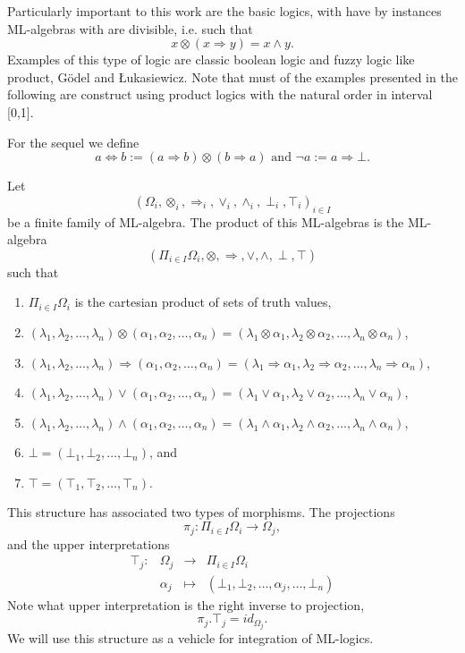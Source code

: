 \documentclass[oribibl]{llncs}
\begin{document}
Particularly important to this work are the basic logics, with have by instances ML-algebras with are divisible, i.e. such that
\[
x\otimes(x\Rightarrow y)= x \wedge y.
\]
Examples of this type of logic are classic boolean logic and fuzzy logic like product, G\"{o}del and {\L}ukasiewicz. Note that must of the examples presented in the following are construct using product logics with the natural order in interval [0,1].

For the sequel we define
\[
a\Leftrightarrow b := (a\Rightarrow b)\otimes (b\Rightarrow a) \text{ and }
\neg a := a\Rightarrow \bot.
\]

Let
\[
(\Omega_i,\otimes_i,\Rightarrow_i,\vee_i,\wedge_i,\perp_i,\top_i)_{i\in I}
\]
be a finite family of ML-algebra. The product of this ML-algebras is the ML-algebra
\[
(\Pi_{i\in I}\Omega_i,\otimes,\Rightarrow,\vee,\wedge,\perp,\top)
\]
such that
\begin{enumerate}
  \item $\Pi_{i\in I}\Omega_i$ is the cartesian product of sets of truth values,
  \item $(\lambda_1,\lambda_2,\ldots,\lambda_n)\otimes(\alpha_1,\alpha_2,\ldots,\alpha_n)=(\lambda_1\otimes\alpha_1,\lambda_2\otimes\alpha_2,\ldots,\lambda_n\otimes\alpha_n)$,
  \item $(\lambda_1,\lambda_2,\ldots,\lambda_n)\Rightarrow(\alpha_1,\alpha_2,\ldots,\alpha_n)=(\lambda_1\Rightarrow\alpha_1,\lambda_2\Rightarrow\alpha_2,\ldots,\lambda_n\Rightarrow\alpha_n)$,
  \item $(\lambda_1,\lambda_2,\ldots,\lambda_n)\vee(\alpha_1,\alpha_2,\ldots,\alpha_n)=(\lambda_1\vee\alpha_1,\lambda_2\vee\alpha_2,\ldots,\lambda_n\vee\alpha_n)$,
  \item  $(\lambda_1,\lambda_2,\ldots,\lambda_n)\wedge(\alpha_1,\alpha_2,\ldots,\alpha_n)=(\lambda_1\wedge\alpha_1,\lambda_2\wedge\alpha_2,\ldots,\lambda_n\wedge\alpha_n)$,
  \item $\bot=(\bot_1,\bot_2,\ldots,\bot_n)$, and
  \item $\top=(\top_1,\top_2,\ldots,\top_n)$.
\end{enumerate}
This structure has associated two types of morphisms. The projections
\[
\pi_j:\Pi_{i\in I}\Omega_i\rightarrow\Omega_j,
\]
and the upper interpretations
\[
\begin{array}{cccl}
  \top_j: & \Omega_j & \rightarrow & \Pi_{i\in I}\Omega_i\\
          & \alpha_j & \mapsto & (\bot_1,\bot_2,\ldots,\alpha_j,\ldots,\bot_n)
\end{array}
\]
Note what upper interpretation is the right inverse to projection,
\[
\pi_j.\top_j=id_{\Omega_j}.
\]
We will use this structure as a vehicle for integration of ML-logics.
\end{document}

